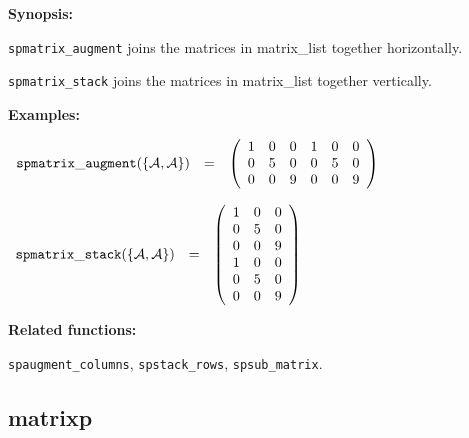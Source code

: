 {\bf Synopsis:} 

\hspace*{0.175in} {\tt spmatrix\_augment} joins the matrices in 
                  matrix\_list together horizontally. 

\hspace*{0.175in} 
{\tt spmatrix\_stack} joins the matrices in matrix\_list 
                together vertically.

{\bf Examples:}

\begin{flushleft}  
\hspace*{0.1in}
\begin{math}  
\begin{array}{ccc}
{\tt spmatrix\_augment}(\{{\cal A,A}\}) & = & 
        \left( \begin{array}{cccccc} 1 & 0 & 0 & 1 & 0 & 0 \\ 0 & 5 & 0 
& 0 & 5 & 0 \\ 0 & 0 & 9 & 0 & 0 & 9
 \end{array} \right) 
\end{array}
\end{math}  
\end{flushleft}

\vspace*{0.1in}

\begin{flushleft}  
\hspace*{0.1in}
\begin{math}  
\begin{array}{ccc}
{\tt spmatrix\_stack}(\{{\cal A,A}\}) & = & 
        \left( \begin{array}{ccc} 1 & 0 & 0 \\ 0 & 5 & 0 \\ 0 & 0 & 9 
\\ 1 & 0 & 0 \\ 0 & 5 & 0 \\ 0 & 0 & 9 
 \end{array} \right) 
\end{array}
\end{math}  
\end{flushleft}

{\bf Related functions:}

\hspace*{0.175in} {\tt spaugment\_columns}, {\tt spstack\_rows}, 
{\tt spsub\_matrix}.


\subsection{matrixp}

